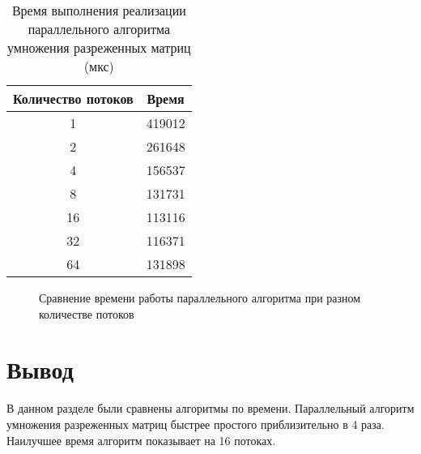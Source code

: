 \begin{table}[h]
	\begin{center}
		\caption{ Время выполнения реализации параллельного алгоритма умножения разреженных матриц (мкс)}
		\label{tbl:random}
		\begin{tabular}{|c|c|}
			\hline
			Количество потоков & Время \\
			\hline
			1 &  419012\\
			\hline
			2 &  261648\\
			\hline
			4 &  156537\\
			\hline
			8 &  131731\\
			\hline
			16 &  113116\\
			\hline
			32 &  116371\\
			\hline
			64 &  131898\\
			\hline
		\end{tabular}
	\end{center}
\end{table}
\FloatBarrier

\begin{figure}[h]
	\captionsetup{singlelinecheck = false, justification=centering}
	\centering
	\caption{Сравнение времени работы параллельного алгоритма при разном количестве потоков}
	\label{time_best}
\end{figure}

\FloatBarrier

\section*{Вывод}

В данном разделе были сравнены алгоритмы по времени. Параллельный алгоритм умножения разреженных матриц быстрее простого приблизительно в 4 раза. Наилучшее время алгоритм показывает на 16 потоках.
